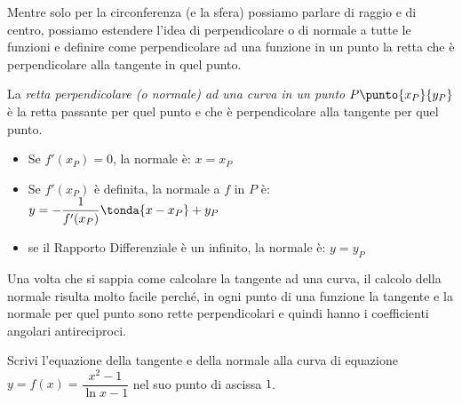 Mentre solo per la circonferenza (e la sfera) possiamo parlare di raggio e di 
centro, possiamo estendere l'idea di perpendicolare o di normale a tutte le 
funzioni e definire come perpendicolare ad una funzione in un punto la retta 
che è perpendicolare alla tangente in quel punto.

\begin{definizione}
\label{def:differenziazione_normale}
La \emph{retta perpendicolare (o normale) ad una curva in un punto} 
\(P\punto{x_P}{y_P}\) 
è la retta passante per quel punto e che è perpendicolare alla tangente 
per quel punto. 
\begin{itemize} [nosep]
\item Se \(f'(x_P) = 0\), la normale è: \quad 
\(x = x_P\)
\item Se \(f'(x_P)\) è definita, la normale a \(f\) in \(P\) è: \quad 
\(y = -\dfrac{1}{f'(x_P)}\tonda{x - x_P} +y_P\)
\item se il Rapporto Differenziale è un infinito, la normale è: \quad 
\(y = y_P\)
\end{itemize}
\end{definizione}

Una volta che si sappia come calcolare la tangente ad una curva, il calcolo 
della normale risulta molto facile perché, in ogni punto di una funzione la 
tangente e la normale per quel punto sono rette perpendicolari e quindi 
hanno i coefficienti angolari antireciproci.

\begin{esempio}
Scrivi l'equazione della tangente e della normale alla curva di equazione \\
\(y = f(x) = \dfrac{x^2-1}{\ln x -1}\) nel suo punto di ascissa \quad \(1\). 


\end{esempio}

